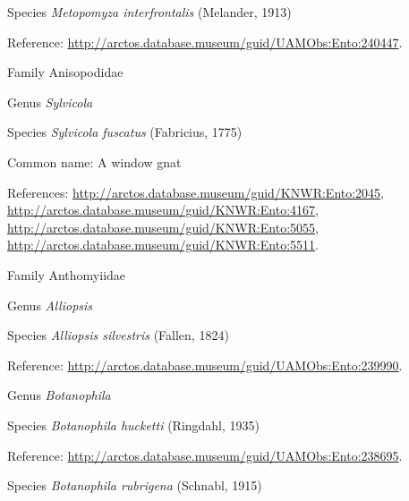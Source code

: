 \documentclass[9pt, article]{memoir}
\begin{document}
\begin{multicols}{2}
\vspace{6pt}\noindent\hspace{36pt}Species \textit{Metopomyza interfrontalis} (Melander, 1913)


Reference: 
\url{http://arctos.database.museum/guid/UAMObs:Ento:240447}.

\vspace{6pt}\noindent\hspace{24pt}Family Anisopodidae


\vspace{6pt}\noindent\hspace{30pt}Genus \textit{Sylvicola}


\vspace{6pt}\noindent\hspace{36pt}Species \textit{Sylvicola fuscatus} (Fabricius, 1775)


Common name: A window gnat

References: 
\url{http://arctos.database.museum/guid/KNWR:Ento:2045}, 
\url{http://arctos.database.museum/guid/KNWR:Ento:4167}, 
\url{http://arctos.database.museum/guid/KNWR:Ento:5055}, 
\url{http://arctos.database.museum/guid/KNWR:Ento:5511}.

\vspace{6pt}\noindent\hspace{24pt}Family Anthomyiidae


\vspace{6pt}\noindent\hspace{30pt}Genus \textit{Alliopsis}


\vspace{6pt}\noindent\hspace{36pt}Species \textit{Alliopsis silvestris} (Fallen, 1824)


Reference: 
\url{http://arctos.database.museum/guid/UAMObs:Ento:239990}.

\vspace{6pt}\noindent\hspace{30pt}Genus \textit{Botanophila}


\vspace{6pt}\noindent\hspace{36pt}Species \textit{Botanophila hucketti} (Ringdahl, 1935)


Reference: 
\url{http://arctos.database.museum/guid/UAMObs:Ento:238695}.

\vspace{6pt}\noindent\hspace{36pt}Species \textit{Botanophila rubrigena} (Schnabl, 1915)



\end{multicols}
\end{document}
